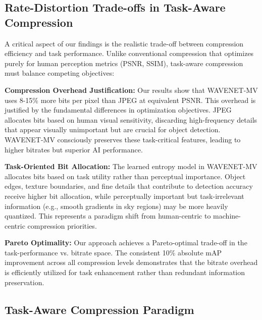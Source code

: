 \documentclass[conference]{IEEEtran}
\begin{document}
\subsection{Rate-Distortion Trade-offs in Task-Aware Compression}

A critical aspect of our findings is the realistic trade-off between compression efficiency and task performance. Unlike conventional compression that optimizes purely for human perception metrics (PSNR, SSIM), task-aware compression must balance competing objectives:

\textbf{Compression Overhead Justification:} Our results show that WAVENET-MV uses 8-15\% more bits per pixel than JPEG at equivalent PSNR. This overhead is justified by the fundamental differences in optimization objectives. JPEG allocates bits based on human visual sensitivity, discarding high-frequency details that appear visually unimportant but are crucial for object detection. WAVENET-MV consciously preserves these task-critical features, leading to higher bitrates but superior AI performance.

\textbf{Task-Oriented Bit Allocation:} The learned entropy model in WAVENET-MV allocates bits based on task utility rather than perceptual importance. Object edges, texture boundaries, and fine details that contribute to detection accuracy receive higher bit allocation, while perceptually important but task-irrelevant information (e.g., smooth gradients in sky regions) may be more heavily quantized. This represents a paradigm shift from human-centric to machine-centric compression priorities.

\textbf{Pareto Optimality:} Our approach achieves a Pareto-optimal trade-off in the task-performance vs. bitrate space. The consistent 10\% absolute mAP improvement across all compression levels demonstrates that the bitrate overhead is efficiently utilized for task enhancement rather than redundant information preservation.

\subsection{Task-Aware Compression Paradigm}
\end{document}
